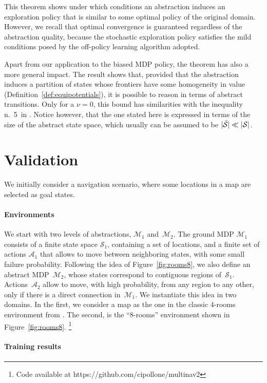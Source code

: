 \documentclass[letterpaper]{article} %
\theoremstyle{plain}
\theoremstyle{definition}
\theoremstyle{remark}
\DeclarePairedDelimiter{\abs}{\lvert}{\rvert}
\newcommand{\SetSym}[1]{\mathcal{#1}}
\newcommand{\States}{\SetSym{S}}
\newcommand{\Actions}{\SetSym{A}}
\newcommand{\Model}{\SetSym{M}}
\newcommand{\Abst}[1]{\bar{#1}}
\newcommand{\PHomogeneity}{\nu}
\begin{document}
This theorem shows under which conditions an abstraction induces an exploration policy that is similar to some optimal policy of the original domain.
However, we recall that optimal convergence is guaranteed regardless of the abstraction quality, because the stochastic exploration policy satisfies the mild conditions posed by the off-policy learning algorithm adopted.

Apart from our application to the biased MDP policy, the theorem has also a more general impact.
The result shows that, provided that the abstraction induces a partition of states whose frontiers have some homogeneity in value (Definition~\ref{def:equipotentials}), it is possible to reason in terms of abstract transitions.
Only for a $\PHomogeneity=0$, this bound has similarities with the inequality n.~5\ in
\cite{abel_2020_ValuePreserving}. Notice however, that the one stated here is expressed
in terms of the size of the abstract state space, which usually can
be assumed to be $\abs{\Abst\States} \ll \abs{\States}$.


\section{Validation}
\label{sec:validation}

We initially consider a navigation scenario, where some locations in a map are selected as goal states.

\paragraph{Environments}
We start with two levels of abstractions, $\Model_1$ and~$\Model_2$.
The ground MDP $\Model_1$ consists of a finite state space $\States_1$,
containing a set of locations, and a finite set of actions $\Actions_1$ that
allows to move between neighboring states, with some small failure probability.
Following the idea of Figure~\ref{fig:rooms8}, we also define an abstract MDP~$\Model_2$,
whose states correspond to contiguous regions of~$\States_1$.
Actions~$\Actions_2$ allow to move, with high probability, from any region to any other, only if there is a direct connection in~$\Model_1$.
We instantiate this idea in two domains. In the first, we consider a map as the one in the classic 4-rooms environment from \cite{sutton1999between}.
The second, is the ``8-rooms'' environment shown in Figure~\ref{fig:rooms8}.%
\footnote{Code available at {https://github.com/cipollone/multinav2}}


\paragraph{Training results}
\end{document}
